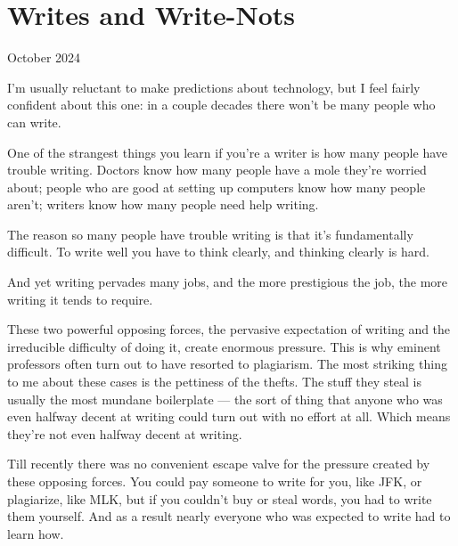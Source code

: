 \chapter{Writes and Write-Nots}


          
        
          


          
            
              
                

October 2024

I'm usually reluctant to make
                  predictions about technology, but I feel fairly confident
                  about this one: in a couple decades there won't be many people
                  who can write.

One of the strangest things you
                  learn if you're a writer is how many people have trouble
                  writing. Doctors know how many people have a mole they're
                  worried about; people who are good at setting up computers
                  know how many people aren't; writers know how many people need
                  help writing.

The reason so many people have
                  trouble writing is that it's fundamentally difficult. To write
                  well you have to think clearly, and thinking clearly is
                  hard.

And yet writing pervades many jobs, and the
                  more prestigious the job, the more writing it tends to
                  require.

These two powerful opposing forces, the
                  pervasive expectation of writing and the irreducible
                  difficulty of doing it, create enormous pressure. This is why
                  eminent professors often turn out to have resorted to
                  plagiarism. The most striking thing to me about these cases is
                  the pettiness of the thefts. The stuff they steal is usually
                  the most mundane boilerplate --- the sort of thing that
                  anyone who was even halfway decent at writing could turn out
                  with no effort at all. Which means they're not even halfway
                  decent at writing.

Till recently there was no
                  convenient escape valve for the pressure created by these
                  opposing forces. You could pay someone to write for you, like
                  JFK, or plagiarize, like MLK, but if you couldn't buy or steal
                  words, you had to write them yourself. And as a result nearly
                  everyone who was expected to write had to learn how.

